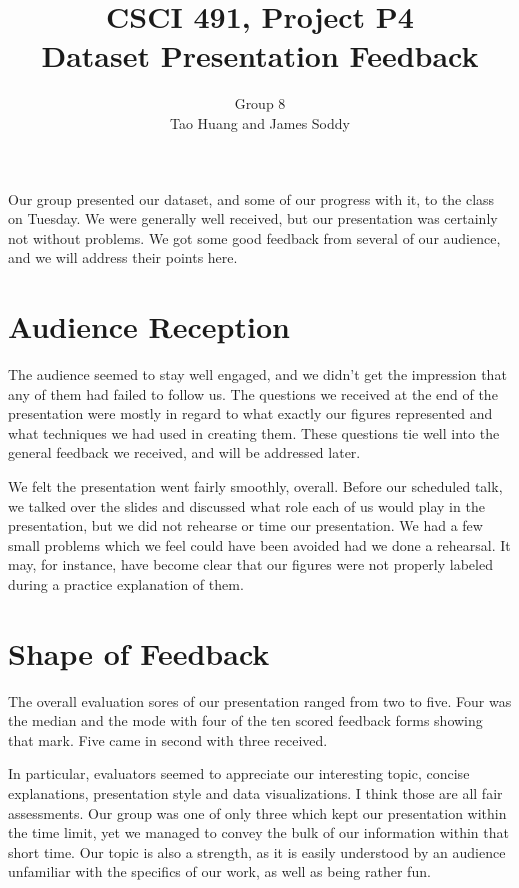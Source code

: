 \documentclass[11pt]{article}
\title{CSCI 491, Project P4\\
		\small{Dataset Presentation Feedback}}
\author{Group 8\\
		\small{Tao Huang and James Soddy}}
\begin{document}
\maketitle

Our group presented our dataset, and some of our progress with it, to the class on
Tuesday. We were generally well received, but our presentation was certainly not
without problems. We got some good feedback from several of our audience, and
we will address their points here.

\section*{Audience Reception}

The audience seemed to stay well engaged, and we didn't get the impression that any
of them had failed to follow us. The questions we received at the end of the
presentation were mostly in regard to what exactly our figures represented and
what techniques we had used in creating them. These questions tie well into the
general feedback we received, and will be addressed later.

We felt the presentation went fairly smoothly, overall. Before our scheduled talk, we 
talked over the slides and
discussed what role each of us would play in the presentation, but we did not rehearse or
time our presentation. We had a few small problems which we feel could have been avoided
had we done a rehearsal. It may, for instance, have become clear that our figures
were not properly labeled during a practice explanation of them.

\section*{Shape of Feedback}

The overall evaluation sores of our presentation ranged from two to five. Four was the
median and the mode with four of the ten scored feedback forms showing that mark.
Five came in second with three received.

In particular, evaluators seemed to appreciate our interesting topic, concise 
explanations, presentation style and data visualizations. I think those are all
fair assessments. Our group was one of only three which kept our presentation
within the time limit, yet we managed to convey the bulk of our information within
that short time. Our topic is also a strength, as it is easily understood by an
audience unfamiliar with the specifics of our work, as well as being rather fun.
\end{document}
